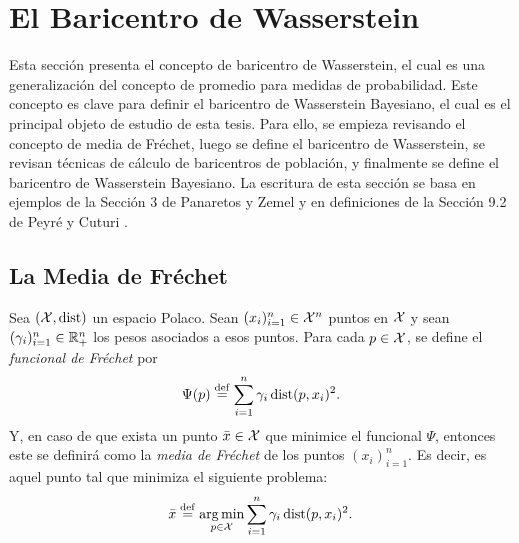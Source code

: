 \section{El Baricentro de Wasserstein}\label{sec:el-baricentro-de-Wasserstein-Bayesiano}  %

Esta sección presenta el concepto de baricentro de Wasserstein, el cual es una generalización del concepto de promedio para medidas de probabilidad. Este concepto es clave para definir el baricentro de Wasserstein Bayesiano, el cual es el principal objeto de estudio de esta tesis. Para ello, se empieza revisando el concepto de media de Fréchet, luego se define el baricentro de Wasserstein, se revisan técnicas de cálculo de baricentros de población, y finalmente se define el baricentro de Wasserstein Bayesiano. La escritura de esta sección se basa en ejemplos de la Sección 3 de Panaretos y Zemel \cite{panaretos2020invitation} y en definiciones de la Sección 9.2 de Peyré y Cuturi \cite{peyre2019computational}.

\subsection{La Media de Fréchet}\label{ssec:la-media-de-Frechet}  %

\begin{definition}
    Sea $(\mathcal{X}, \operatorname{dist})$ un espacio Polaco. Sean $(x_{i})_{i=1}^{n}\in\mathcal{X}^n$ puntos en $\mathcal{X}$ y sean $(\gamma_{i})_{i=1}^{n}\in\mathbb{R}_+^n$ los pesos asociados a esos puntos. Para cada $p\in\mathcal{X}$, se define el \emph{funcional de Fréchet} por
    \begin{equation}
        \label{eq:funcionalFrechet}
        \Psi(p) \stackrel{\mathrm{def}}{=} \sum_{i=1}^{n} \gamma_i \operatorname{dist}(p, x_i)^2.
    \end{equation}
    Y, en caso de que exista un punto $\bar x \in \mathcal{X}$ que minimice el funcional $\Psi$, entonces este se definirá como la \emph{media de Fréchet} de los puntos $(x_{i})_{i=1}^{n}$. Es decir, es aquel punto tal que minimiza el siguiente problema:
    \begin{equation}
        \label{eq:mediaFrechet}
        \bar x \stackrel{\mathrm{def}}{=} \operatorname*{arg\,m{i}n}_{p \in \mathcal{X}} \sum_{i=1}^{n} \gamma_i \operatorname{dist}(p, x_i)^2.
    \end{equation}
\end{definition}

